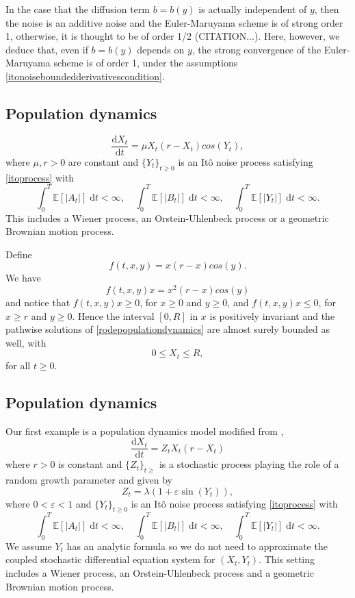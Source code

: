 \documentclass[reqno,12pt]{amsart}
\theoremstyle{plain}%
\theoremstyle{definition}
\begin{document}
In the case that the diffusion term $b = b(y)$ is actually independent of $y$, then the noise is an additive noise and the Euler-Maruyama scheme is of strong order 1, otherwise, it is thought to be of order 1/2 (CITATION...). Here, however, we deduce that, even if $b=b(y)$ depends on $y$, the strong convergence of the Euler-Maruyama scheme is of order 1, under the assumptions \eqref{itonoiseboundedderivativescondition}.

\subsection{Population dynamics}
\begin{equation}
    \label{rodepopulationdynamicsalt}
    \frac{\mathrm{d}X_t}{\mathrm{d}t} = \mu X_t (r - X_t)cos(Y_t),
\end{equation}
where $\mu, r > 0$ are constant and $\{Y_t\}_{t\geq 0}$ is an It\^o noise process satisfying \eqref{itoprocess} with
\[
    \int_0^T \mathbb{E}[|A_t|] \;\mathrm{d}t < \infty, \quad 
    \int_0^T \mathbb{E}[|B_t|] \;\mathrm{d}t < \infty, \quad
    \int_0^T \mathbb{E}[|Y_t|] \;\mathrm{d}t < \infty.
\]
This includes a Wiener process, an Orstein-Uhlenbeck process or a geometric Brownian motion process.

Define 
\[
    f(t, x, y) = x(r - x)cos(y).
\]
We have
\[
    f(t, x, y)x = x^2(r - x)cos(y)
\]
and notice that $f(t, x, y)x \geq 0$, for $x \geq 0$ and $y \geq 0$, and $f(t, x, y)x \leq 0$, for $x \geq r$ and $y \geq 0$. Hence the interval $[0, R]$ in $x$ is positively invariant and the pathwise solutions of \eqref{rodepopulationdynamics} are almost surely bounded as well, with
\[
    0 \leq X_t \leq R,
\]
for all $t \geq 0$.

\subsection{Population dynamics}

Our first example is a population dynamics model modified from \cite[Section 15.2]{HanKloeden2017},
\begin{equation}
    \label{rodepopulationdynamics}
    \frac{\mathrm{d}X_t}{\mathrm{d}t} = Z_t X_t (r - X_t)
\end{equation}
where $r > 0$ is constant and $\{Z_t\}_{t \geq}$ is a stochastic process playing the role of a random growth parameter and given by
\[
    Z_t = \lambda (1 + \varepsilon \sin(Y_t)),
\]
where $0 < \varepsilon < 1$ and $\{Y_t\}_{t\geq 0}$ is an It\^o noise process satisfying \eqref{itoprocess} with
\[
    \int_0^T \mathbb{E}[|A_t|] \;\mathrm{d}t < \infty, \quad 
    \int_0^T \mathbb{E}[|B_t|] \;\mathrm{d}t < \infty, \quad
    \int_0^T \mathbb{E}[|Y_t|] \;\mathrm{d}t < \infty.
\]
We assume $Y_t$ has an analytic formula so we do not need to approximate the coupled stochastic differential equation system for $(X_t, Y_t)$. This setting includes a Wiener process, an Orstein-Uhlenbeck process and a geometric Brownian motion process. 
\end{document}
